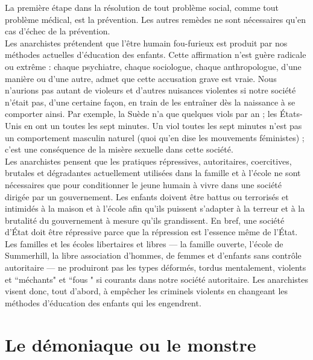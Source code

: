 La première étape dans la résolution de tout problème social, comme tout problème médical, est la prévention. Les autres remèdes ne sont nécessaires qu'en cas d'échec de la prévention.\\
Les anarchistes prétendent que l'être humain fou-furieux est produit par nos méthodes actuelles d'éducation des enfants. Cette affirmation n'est guère radicale ou extrême : chaque psychiatre, chaque sociologue, chaque anthropologue, d'une manière ou d'une autre, admet que cette accusation grave est vraie. Nous n'aurions pas autant de violeurs et d'autres nuisances violentes si notre société n'était pas, d'une certaine façon, en train de les entraîner dès la naissance à se comporter ainsi. Par exemple, la Suède n'a que quelques viols par an ; les États-Unis en ont un toutes les sept minutes. Un viol toutes les sept minutes n'est pas un comportement masculin naturel (quoi qu'en dise les mouvements féministes) ; c'est une conséquence de la misère sexuelle dans cette société.\\
Les anarchistes pensent que les pratiques répressives, autoritaires, coercitives, brutales et dégradantes actuellement utilisées dans la famille et à l'école ne sont nécessaires que pour conditionner le jeune humain à vivre dans une société dirigée par un gouvernement. Les enfants doivent être battus ou terrorisés et intimidés à la maison et à l'école afin qu'ils puissent s'adapter à la terreur et à la brutalité du gouvernement à mesure qu'ils grandissent. En bref, une société d'État doit être répressive parce que la répression est l'essence même de l'État.\\
Les familles et les écoles libertaires et libres --- la famille ouverte, l'école de Summerhill, la libre association d'hommes, de femmes et d'enfants sans contrôle autoritaire --- ne produiront pas les types déformés, tordus mentalement, violents et ``méchants" et ``fous " si courants dans notre société autoritaire. Les anarchistes visent donc, tout d'abord, à empêcher les criminels violents en changeant les méthodes d'éducation des enfants qui les engendrent.

\section*{Le démoniaque ou le monstre}

